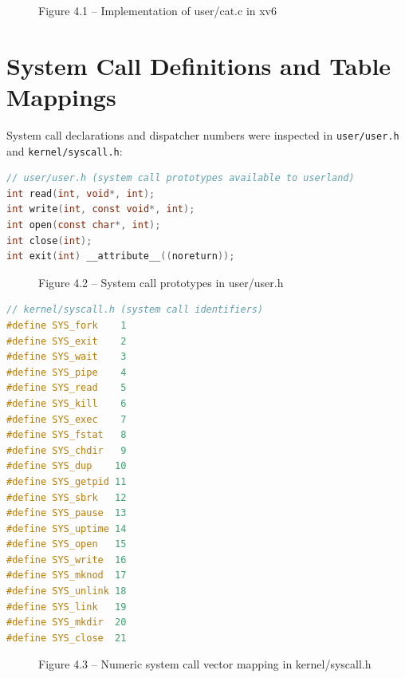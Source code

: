 \documentclass[12pt,a4paper]{report}
\numberwithin{equation}{chapter}
\numberwithin{figure}{chapter}
\numberwithin{table}{chapter}
\begin{document}
\begin{figure}[H]
\centering
\caption{Figure 4.1 -- Implementation of user/cat.c in xv6}
\end{figure}

\section{System Call Definitions and Table Mappings}
System call declarations and dispatcher numbers were inspected in \texttt{user/user.h} and \texttt{kernel/syscall.h}:

\begin{lstlisting}[language=c]
// user/user.h (system call prototypes available to userland)
int read(int, void*, int);
int write(int, const void*, int);
int open(const char*, int);
int close(int);
int exit(int) __attribute__((noreturn));
\end{lstlisting}

\begin{figure}[H]
\centering
\caption{Figure 4.2 -- System call prototypes in user/user.h}
\end{figure}

\begin{lstlisting}[language=c]
// kernel/syscall.h (system call identifiers)
#define SYS_fork    1
#define SYS_exit    2
#define SYS_wait    3
#define SYS_pipe    4
#define SYS_read    5
#define SYS_kill    6
#define SYS_exec    7
#define SYS_fstat   8
#define SYS_chdir   9
#define SYS_dup    10
#define SYS_getpid 11
#define SYS_sbrk   12
#define SYS_pause  13
#define SYS_uptime 14
#define SYS_open   15
#define SYS_write  16
#define SYS_mknod  17
#define SYS_unlink 18
#define SYS_link   19
#define SYS_mkdir  20
#define SYS_close  21
\end{lstlisting}

\begin{figure}[H]
\centering
\caption{Figure 4.3 -- Numeric system call vector mapping in kernel/syscall.h}
\end{figure}
\end{document}
